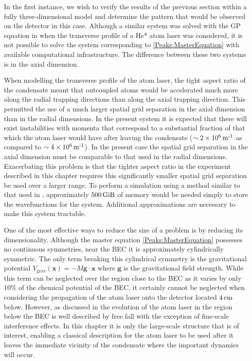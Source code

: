 In the first instance, we wish to verify the results of the previous section within a fully three-dimensional model and determine the pattern that would be observed on the detector in this case. Although a similar system was solved with the GP equation in  when the transverse profile of a He* atom laser was considered, it is not possible to solve the system corresponding to \eqref{Peaks:MasterEquation} with available computational infrastructure. The difference between these two systems is in the axial dimension.

When modelling the transverse profile of the atom laser, the tight aspect ratio of the condensate meant that outcoupled atoms would be accelerated much more along the radial trapping directions than along the axial trapping direction. This permitted the use of a much larger spatial grid separation in the axial dimension than in the radial dimensions. In the present system it is expected that there will exist instabilities with momenta that correspond to a substantial fraction of that which the atom laser would have after leaving the condensate ($\sim \unit[2 \times 10^6]{m\textsuperscript{-1}}$ as compared to $\sim \unit[4 \times 10^6]{m\textsuperscript{-1}}$). In the present case the spatial grid separation in the axial dimension must be comparable to that used in the radial dimensions. Exacerbating this problem is that the tighter aspect ratio in the experiment described in this chapter requires this significantly smaller spatial grid separation be used over a larger range. To perform a simulation using a method similar to that used in , approximately $\unit[500]{GiB}$ of memory would be needed simply to store the wavefunctions for the system. Additional approximations are necessary to make this system tractable.

One of the most effective ways to reduce the size of a problem is by reducing its dimensionality. Although the master equation \eqref{Peaks:MasterEquation} possesses no continuous symmetries, near the BEC it is approximately cylindrically symmetric. The only term breaking this cylindrical symmetry is the gravitational potential $V_\text{grav}(\bm{x}) =- M \bm{g} \cdot \bm{x}$ where $\bm{g}$ is the gravitational field strength. While this term can be neglected over the region close to the BEC as it varies by only $10\%$ of the chemical potential of the BEC, it certainly cannot be neglected when considering the propagation of the atom laser onto the detector located $\unit[4]{cm}$ below. However, as discussed in  the evolution of the atom laser in the region below the BEC is well described by free fall with the exception of fine-scale interference effects. In this chapter it is only the large-scale structure that is of interest, enabling a classical description for the atom laser to be used after it leaves the immediate vicinity of the condensate where the important dynamics will occur.

